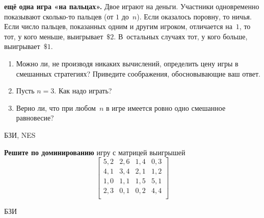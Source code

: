 \begin{problem}
 {\bf ещё одна игра «на пальцах».} Двое играют на
деньги. Участники одновременно показывают сколько-то
пальцев (от $1$ до~$n$). Если оказалось поровну, то ничья.
Если число пальцев, показанных одним и другим игроком,
отличается на~$1$, то тот, у кого меньше, выигрывает~$\$2$.
В~остальных случаях тот, у кого больше, выигрывает~$\$1$.

\begin{enumerate}

\item Можно ли, не производя никаких вычислений, определить
цену игры в смешанных стратегиях? Приведите соображения,
обосновывающие ваш ответ.

\item Пусть $n=3$. Как надо играть?

\item Верно ли, что при любом~$n$ в игре имеется ровно одно
смешанное равновесие?

\end{enumerate}




\begin{source}
БЗИ, NES
\end{source}


\begin{sol}

\end{sol}
\end{problem}




\begin{problem}
 {\bf Решите по доминированию} игру с матрицей
выигрышей
\[\left[\begin{array}{cccc} 5,2&2,6&1,4&0,3\\ 4,1&3,4&2,1&1,2\\
1,0&1,1&1,5&5,1\\ 2,3&0,1&0,2&4,4\\
\end{array}\right]\]



\begin{source}
БЗИ
\end{source}


\begin{sol}

\end{sol}
\end{problem}




